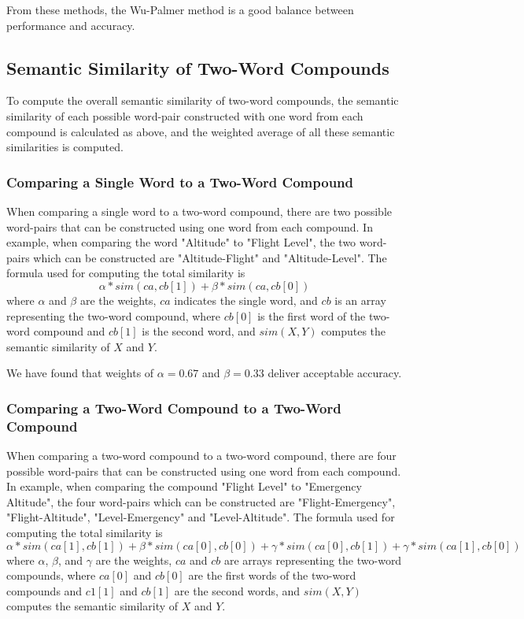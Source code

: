 \documentclass{article}
\begin{document}
From these methods, the Wu-Palmer method is a good balance between performance and accuracy.\cite{budanitsky2006evaluating,seco2004intrinsic,mihalcea2006corpus}

\subsection{Semantic Similarity of Two-Word Compounds}

To compute the overall semantic similarity of two-word compounds, the semantic similarity of each possible word-pair constructed with one word from each compound is calculated as above, and the weighted average of all these semantic similarities is computed.

\subsubsection{Comparing a Single Word to a Two-Word Compound}

When comparing a single word to a two-word compound, there are two possible word-pairs that can be constructed using one word from each compound. In example, when comparing the word "Altitude" to "Flight Level", the two word-pairs which can be constructed are "Altitude-Flight" and "Altitude-Level".
The formula used for computing the total similarity is 
\begin{equation} \label{eq:1wordto2word}
	\alpha * sim(ca, cb[1]) + \beta * sim(ca, cb[0])
\end{equation}
where $ \alpha $ and $ \beta $ are the weights, $ ca $ indicates the single word, and $ cb $ is an array representing the two-word compound, where $ cb[0] $ is the first word of the two-word compound and $ cb[1] $ is the second word, and $ sim(X,Y) $ computes the semantic similarity of $ X $ and $ Y $.

We have found that weights of $ \alpha = 0.67 $ and $ \beta = 0.33 $ deliver acceptable accuracy. %

\subsubsection{Comparing a Two-Word Compound to a Two-Word Compound}

When comparing a two-word compound to a two-word compound, there are four possible word-pairs that can be constructed using one word from each compound. In example, when comparing the compound "Flight Level" to "Emergency Altitude", the four word-pairs which can be constructed are "Flight-Emergency", "Flight-Altitude", "Level-Emergency" and "Level-Altitude".
The formula used for computing the total similarity is 
\begin{equation} \label{eq:2wordto2word}
	\alpha * sim(ca[1], cb[1]) + \beta * sim(ca[0], cb[0]) + \gamma * sim(ca[0], cb[1]) + \gamma * sim(ca[1], cb[0])
\end{equation}
where $ \alpha $, $ \beta $, and $ \gamma $ are the weights, $ ca $ and $ cb $ are arrays representing the two-word compounds, where $ ca[0] $ and $ cb[0] $ are the first words of the two-word compounds and $ c1[1] $ and $ cb[1] $ are the second words, and $ sim(X,Y) $ computes the semantic similarity of $ X $ and $ Y $. 
\end{document}
